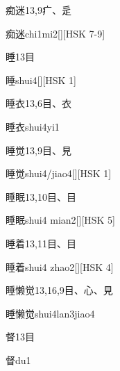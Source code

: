 \begin{Entry}{痴迷}{13,9}{⽧、⾡}
  \begin{Phonetics}{痴迷}{chi1mi2}[][HSK 7-9]
  \end{Phonetics}
\end{Entry}

\begin{Entry}{睡}{13}{⽬}
  \begin{Phonetics}{睡}{shui4}[][HSK 1]
  \end{Phonetics}
\end{Entry}

\begin{Entry}{睡衣}{13,6}{⽬、⾐}
  \begin{Phonetics}{睡衣}{shui4yi1}
  \end{Phonetics}
\end{Entry}

\begin{Entry}{睡觉}{13,9}{⽬、⾒}
  \begin{Phonetics}{睡觉}{shui4/jiao4}[][HSK 1]
  \end{Phonetics}
\end{Entry}

\begin{Entry}{睡眠}{13,10}{⽬、⽬}
  \begin{Phonetics}{睡眠}{shui4 mian2}[][HSK 5]
  \end{Phonetics}
\end{Entry}

\begin{Entry}{睡着}{13,11}{⽬、⽬}
  \begin{Phonetics}{睡着}{shui4 zhao2}[][HSK 4]
  \end{Phonetics}
\end{Entry}

\begin{Entry}{睡懒觉}{13,16,9}{⽬、⼼、⾒}
  \begin{Phonetics}{睡懒觉}{shui4lan3jiao4}
  \end{Phonetics}
\end{Entry}

\begin{Entry}{督}{13}{⽬}
  \begin{Phonetics}{督}{du1}
  \end{Phonetics}
\end{Entry}

